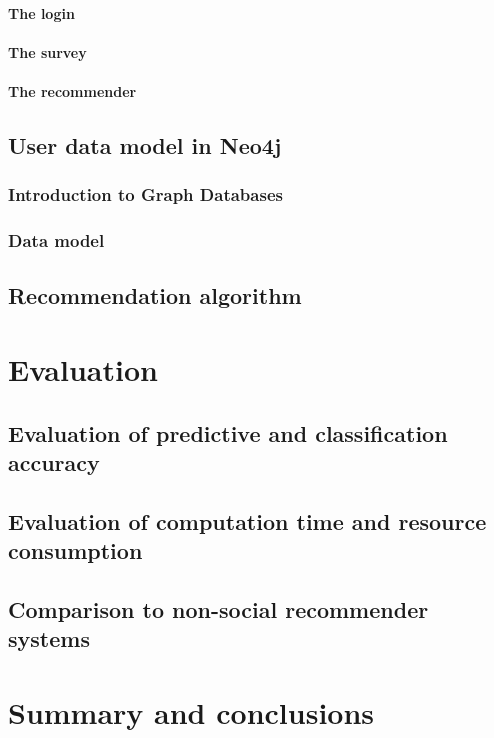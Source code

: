 \documentclass[12pt]{report}
\begin{document}
\subsubsection{The login}

\subsubsection{The survey}

\subsubsection{The recommender}

%
\section{User data model in Neo4j}

\subsection{Introduction to Graph Databases}

\subsection{Data model}

\section{Recommendation algorithm}

\chapter{Evaluation}
\section{Evaluation of predictive and classification accuracy}
\section{Evaluation of computation time and resource consumption}
\section{Comparison to non-social recommender systems}

\chapter{Summary and conclusions}
\end{document}
